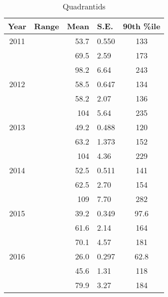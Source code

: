 \documentclass[a4paper,12pt,twocolumn]{report}
\begin{document}
\begin{appendices}
\begin{table*}
	\centering
	\begin{tabular}{|c|c|r@{ \,$\pm$\, }l|c|}
		\hline 
		Year & Range & Mean & S.E. & 90th \%ile\\ 
		\hline 
		2011 & & 53.7 & 0.550 & 133   \\ 
		\hline 
		& & 69.5 & 2.59 & 173   \\ 
		\hline 
		& & 98.2 & 6.64 & 243   \\ 
		\hline 
		2012 & & 58.5 & 0.647 & 134   \\ 
		\hline 
		& & 58.2 & 2.07 & 136   \\ 
		\hline 
		& & 104 & 5.64 & 235   \\ 
		\hline 
		2013 & & 49.2 & 0.488 & 120   \\ 
		\hline 
		& & 63.2 & 1.373 & 152   \\ 
		\hline 
		& & 104 & 4.36 & 229   \\ 
		\hline 
		2014 & & 52.5 & 0.511 & 141   \\ 
		\hline 
		& & 62.5 & 2.70 & 154   \\ 
		\hline 
		& & 109 & 7.70 & 282  \\ 
		\hline 
		2015 & & 39.2 & 0.349 & 97.6   \\ 
		\hline 
		& & 61.6 & 2.14 & 164   \\ 
		\hline 
		& & 70.1 & 4.57 & 181   \\ 
		\hline
		2016 & & 26.0 & 0.297 & 62.8	\\
		\hline 
		& & 45.6 & 1.31 & 118   \\ 
		\hline 
		& & 79.9 & 3.27 & 184   \\ 
		\hline 
	\end{tabular}
	\caption{Quadrantids} 
\end{table*}


\end{appendices}
\end{document}
